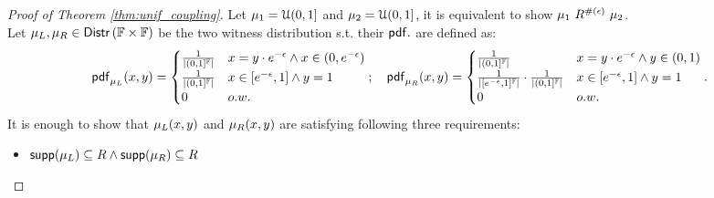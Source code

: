 \documentclass[a4paper,11pt]{article}
\begin{document}
\begin{proof}[Proof of Theorem \ref{thm:unif_coupling}]
%
Let $\mu_1 = \mathcal{U}(0, 1]$ and $\mu_2 = \mathcal{U}(0, 1]$, it is equivalent to show 
${\mu_1} ~ R^{\#(\epsilon)} ~ \mu_2$.
%
%
%
\\
%
Let $\mu_L, \mu_R \in \mathsf{Distr}\left({\mathbb{F}} \times {\mathbb{F}}\right)$ 
be the two witness distribution s.t.
their $\mathsf{pdf}.$ are defined as:
{\small\[
	\mathsf{pdf}_{\mu_L}(x, y) = 
	\begin{cases}
	\frac{1}{\left \vert (0, 1]^{\mathbb{F}} \right \vert} 
	& x = y \cdot e^{-\epsilon} \land x \in (0, e^{-\epsilon})\\
	\frac{1}{\left \vert (0, 1]^{\mathbb{F}} \right \vert} 	
	& x \in [e^{-\epsilon}, 1] \land y = 1\\
	0       
	& o.w.
	\end{cases};
~~~
	\mathsf{pdf}_{\mu_R}(x, y) = 
	\begin{cases}
	\frac{1}{\left \vert (0, 1]^{\mathbb{F}} \right \vert}	
	& x = y \cdot e^{-\epsilon} \land y \in (0, 1)\\
	\frac{1}{\left \vert [e^{-\epsilon}, 1]^{\mathbb{F}} \right \vert} \cdot \frac{1}{\left \vert (0, 1]^{\mathbb{F}} \right \vert}
	& x \in [e^{-\epsilon}, 1] \land y = 1\\
	0       & o.w.
	\end{cases}.
\]
}
It is enough to show that $\mu_L(x, y)$ and $\mu_R(x, y)$ are satisfying following three requirements:
\begin{itemize}
	\item $\mathsf{supp}(\mu_L) \subseteq R \land \mathsf{supp}(\mu_R) \subseteq R$
%
%
%
\end{itemize}
\end{proof}
\end{document}
